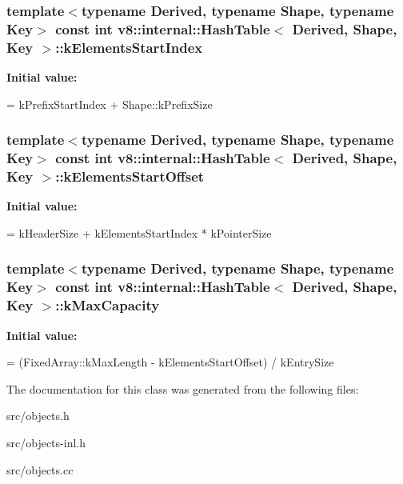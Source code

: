 \subsubsection[{k\+Elements\+Start\+Index}]{\setlength{\rightskip}{0pt plus 5cm}template$<$typename Derived, typename Shape, typename Key$>$ const int {\bf v8\+::internal\+::\+Hash\+Table}$<$ Derived, Shape, Key $>$\+::k\+Elements\+Start\+Index\hspace{0.3cm}{\ttfamily [static]}}\label{classv8_1_1internal_1_1_hash_table_a2e2b830482a0692ffc3ffd22dcfa07df}
{\bfseries Initial value\+:}
\begin{DoxyCode}
=
      kPrefixStartIndex + Shape::kPrefixSize
\end{DoxyCode}
\hypertarget{classv8_1_1internal_1_1_hash_table_ae8624ace4a507ce7d6e0686a0aaf5718}{}
\subsubsection[{k\+Elements\+Start\+Offset}]{\setlength{\rightskip}{0pt plus 5cm}template$<$typename Derived, typename Shape, typename Key$>$ const int {\bf v8\+::internal\+::\+Hash\+Table}$<$ Derived, Shape, Key $>$\+::k\+Elements\+Start\+Offset\hspace{0.3cm}{\ttfamily [static]}}\label{classv8_1_1internal_1_1_hash_table_ae8624ace4a507ce7d6e0686a0aaf5718}
{\bfseries Initial value\+:}
\begin{DoxyCode}
=
      kHeaderSize + kElementsStartIndex * kPointerSize
\end{DoxyCode}
\hypertarget{classv8_1_1internal_1_1_hash_table_ac08bac76e122c2738f8c15c21f8365dd}{}
\subsubsection[{k\+Max\+Capacity}]{\setlength{\rightskip}{0pt plus 5cm}template$<$typename Derived, typename Shape, typename Key$>$ const int {\bf v8\+::internal\+::\+Hash\+Table}$<$ Derived, Shape, Key $>$\+::k\+Max\+Capacity\hspace{0.3cm}{\ttfamily [static]}}\label{classv8_1_1internal_1_1_hash_table_ac08bac76e122c2738f8c15c21f8365dd}
{\bfseries Initial value\+:}
\begin{DoxyCode}
=
      (FixedArray::kMaxLength - kElementsStartOffset) / kEntrySize
\end{DoxyCode}


The documentation for this class was generated from the following files\+:\begin{DoxyCompactItemize}
\item 
src/objects.\+h\item 
src/objects-\/inl.\+h\item 
src/objects.\+cc\end{DoxyCompactItemize}
